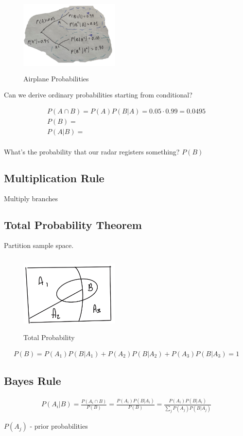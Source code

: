 \begin{figure}[ht]
\centering
\includegraphics[width=5cm, height=4cm]{images/L02/airplane_radar.jpeg}
\caption{Airplane Probabilities}
\end{figure}

Can we derive ordinary probabilities starting from conditional?

\begin{align*}
P(A \cap B) = P(A)P(B|A) = 0.05\cdot 0.99 = 0.0495\\
P(B) =\\
P(A|B) =\\
\end{align*}


What's the probability that our radar registers something? $P(B)$

\subsection{Multiplication Rule}


Multiply branches


\subsection{Total Probability Theorem}

Partition sample space.

\begin{figure}[ht]
\centering
\includegraphics[width=5cm, height=4cm]{images/L02/total_prob.jpeg}
\caption{Total Probability}
\end{figure}

\begin{align*}
P(B)=P(A_1)P(B|A_1) + P(A_2)P(B|A_2) + P(A_3)P(B|A_3) = 1
\end{align*}

\subsection{Bayes Rule}

\begin{align*}
P(A_i|B) = \frac{P(A_i \cap B)}{P(B)} = \frac{P(A_i)P(B|A_i)}{P(B)} = \frac{P(A_i)P(B|A_i)}{\sum_j P(A_j)P(B|A_j)}
\end{align*}

$P(A_j)$ - prior probabilities
